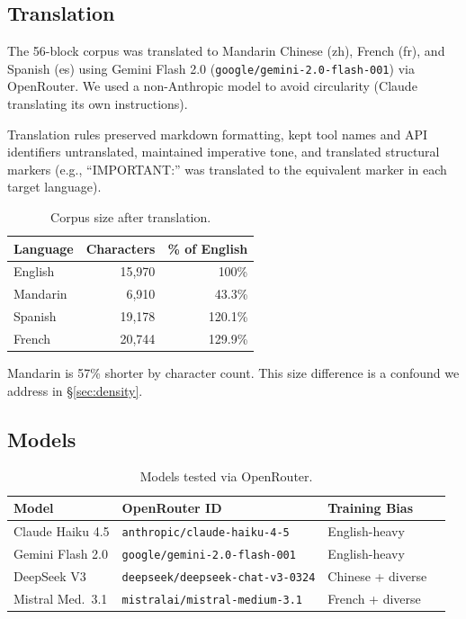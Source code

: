 \documentclass[11pt,a4paper]{article}
\begin{document}
\subsection{Translation}

The 56-block corpus was translated to Mandarin Chinese (zh), French
(fr), and Spanish (es) using Gemini Flash 2.0
(\texttt{google/gemini-2.0-flash-001}) via OpenRouter. We used a
non-Anthropic model to avoid circularity (Claude translating its own
instructions).

Translation rules preserved markdown formatting, kept tool names and
API identifiers untranslated, maintained imperative tone, and
translated structural markers (e.g., ``IMPORTANT:'' was translated
to the equivalent marker in each target language).

\begin{table}[ht]
\centering
\caption{Corpus size after translation.}
\label{tab:corpus-size}
\begin{tabular}{lrr}
\toprule
Language & Characters & \% of English \\
\midrule
English  & 15,970 & 100\% \\
Mandarin & 6,910  & 43.3\% \\
Spanish  & 19,178 & 120.1\% \\
French   & 20,744 & 129.9\% \\
\bottomrule
\end{tabular}
\end{table}

Mandarin is 57\% shorter by character count. This size difference is
a confound we address in \S\ref{sec:density}.

\subsection{Models}

\begin{table}[ht]
\centering
\caption{Models tested via OpenRouter.}
\label{tab:models}
\begin{tabular}{llll}
\toprule
Model & OpenRouter ID & Training Bias \\
\midrule
Claude Haiku 4.5 & \texttt{anthropic/claude-haiku-4-5} & English-heavy \\
Gemini Flash 2.0 & \texttt{google/gemini-2.0-flash-001} & English-heavy \\
DeepSeek V3     & \texttt{deepseek/deepseek-chat-v3-0324} & Chinese + diverse \\
Mistral Med.\ 3.1 & \texttt{mistralai/mistral-medium-3.1} & French + diverse \\
\bottomrule
\end{tabular}
\end{table}
\end{document}
